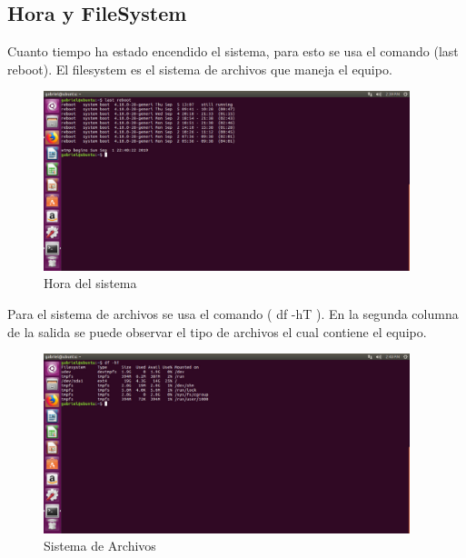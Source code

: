 \documentclass[
  letterpaper, 
  maincolor=black,
  sectioncolor=black!90,
  subsectioncolor=black!70,
  itemtextcolor=black!40,
]{fortysecondscv}
\begin{document}
    \subsection{Hora y FileSystem}
        Cuanto tiempo ha estado encendido el sistema, para esto se usa el comando (last reboot). El filesystem es el sistema de archivos que maneja el equipo.
        \begin{figure}[H]
            \centering
            \includegraphics[trim= 0 390 580 0,clip,width=0.95\textwidth]{img/hola.jpg}
            \caption{Hora del sistema}
            \label{fig:my_label}
        \end{figure}
        Para el sistema de archivos se usa el comando ( df -hT ). En la segunda columna de la salida se puede observar el tipo de archivos el cual contiene el equipo.
        \begin{figure}[H]
            \centering
            \includegraphics[trim= 0 430 580 0,clip,width=0.95\textwidth]{img/files.jpg}
            \caption{Sistema de Archivos}
            \label{fig:my_label}
        \end{figure}
        \newpage
\end{document}
